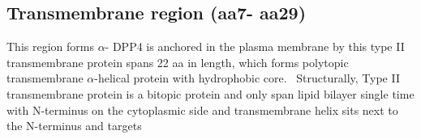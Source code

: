 \subsection{Transmembrane region (aa7- aa29)}

This region forms $\alpha$-
DPP4 is anchored in the plasma membrane by this type II transmembrane protein spans 22 aa in length, which forms polytopic transmembrane $\alpha$-helical protein with hydrophobic core.~\cite{Hong_1990} Structurally, Type II transmembrane protein is a bitopic protein and only span lipid bilayer single time with N-terminus on the cytoplasmic side and transmembrane helix sits next to the N-terminus and targets 


